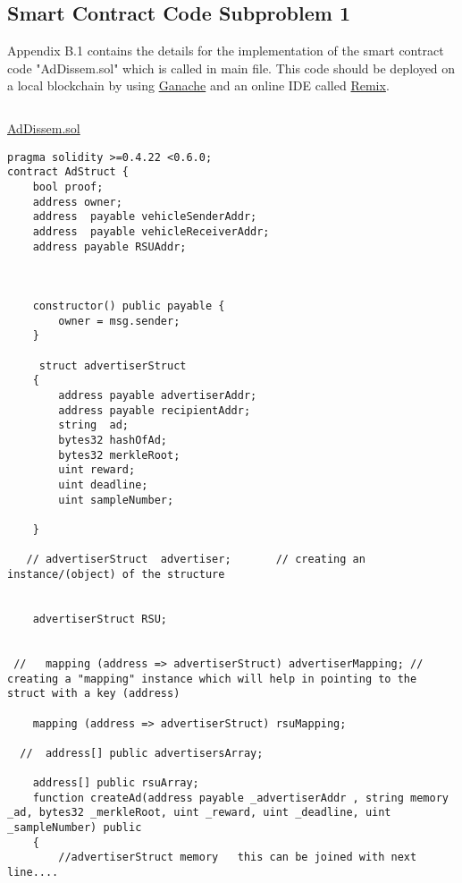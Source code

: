\newpage
\subsection{Smart Contract Code Subproblem 1}
Appendix B.1 contains the details for the implementation of the smart contract code "AdDissem.sol" which is called in main file. This code should be deployed on a local blockchain by using \href{https://www.trufflesuite.com/ganache}{Ganache} and an online IDE called \href{http://remix.ethereum.org/}{Remix}.\par

\begin{linenumbers}
\begin{lstlisting}

\end{lstlisting}
\hypertarget{milp_code}{}
\hyperlink{milp_text}{AdDissem.sol}
\begin{lstlisting}
pragma solidity >=0.4.22 <0.6.0;
contract AdStruct {
    bool proof;
    address owner;
    address  payable vehicleSenderAddr;
    address  payable vehicleReceiverAddr;
    address payable RSUAddr;
    
    
    
    constructor() public payable { 
        owner = msg.sender; 
    }
    
     struct advertiserStruct
    {
        address payable advertiserAddr;
        address payable recipientAddr;
        string  ad;
        bytes32 hashOfAd;
        bytes32 merkleRoot;
        uint reward;
        uint deadline;
        uint sampleNumber;
        
    }
    
   // advertiserStruct  advertiser;       // creating an instance/(object) of the structure
    
   
    advertiserStruct RSU;

    
 //   mapping (address => advertiserStruct) advertiserMapping; // creating a "mapping" instance which will help in pointing to the struct with a key (address)
    
    mapping (address => advertiserStruct) rsuMapping;

  //  address[] public advertisersArray;

    address[] public rsuArray;
    function createAd(address payable _advertiserAddr , string memory _ad, bytes32 _merkleRoot, uint _reward, uint _deadline, uint _sampleNumber) public
    {
        //advertiserStruct memory   this can be joined with next line....


\end{lstlisting}
\end{linenumbers}

